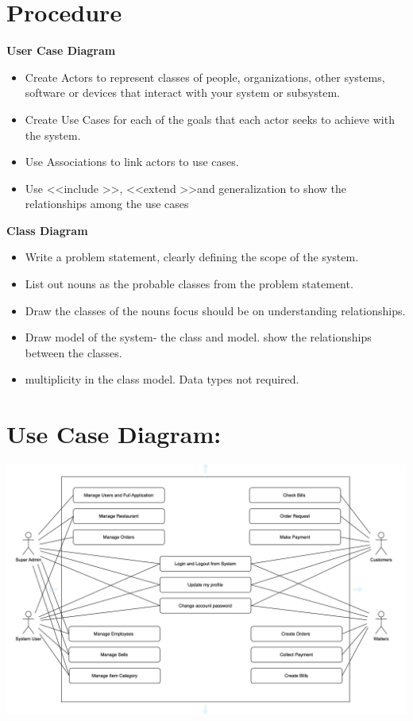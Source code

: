 \documentclass{article}
\begin{document}
\section{\textbf{Procedure}}
\textbf{User Case Diagram}
\begin{itemize}
	\item Create Actors to represent classes of people, organizations, other systems, software or devices that interact with your system or subsystem.
	\item Create Use Cases for each of the goals that each actor seeks to achieve with the system.
	\item Use Associations to link actors to use cases.
	\item Use   \textless \textless include \textgreater \textgreater , \textless \textless extend \textgreater \textgreater and generalization to show the relationships among the use cases
\end{itemize}
\textbf{Class Diagram}
\begin{itemize}
	\item Write a problem statement, clearly defining the scope of the system.
	\item List out nouns as the probable classes from the problem statement.
	\item Draw the classes of the nouns focus should be on understanding relationships.
	\item Draw model of the system- the class and model. show the relationships between the classes.
	\item multiplicity in the class model. Data types not required.
\end{itemize}
\section{\textbf{Use Case Diagram:}}
\begin{center}
	\includegraphics[scale=0.5]{usecasediagram}
\end{center}
\end{document}
